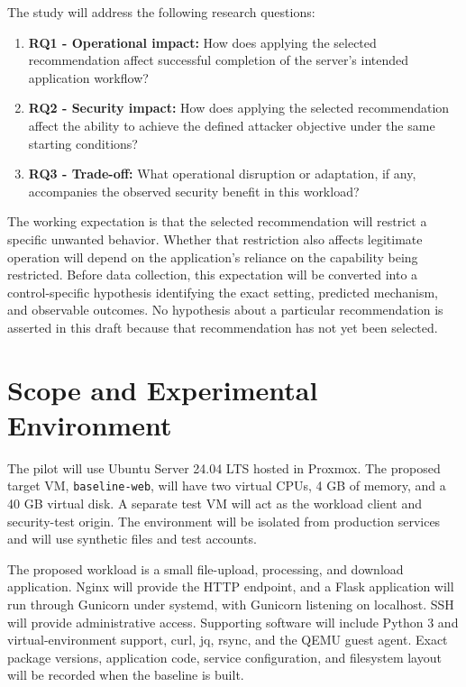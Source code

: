 \documentclass[12pt,letterpaper]{article}
\begin{document}
The study will address the following research questions:

\begin{enumerate}
\item \textbf{RQ1 - Operational impact:} How does applying the selected recommendation affect successful completion of the server's intended application workflow?
\item \textbf{RQ2 - Security impact:} How does applying the selected recommendation affect the ability to achieve the defined attacker objective under the same starting conditions?
\item \textbf{RQ3 - Trade-off:} What operational disruption or adaptation, if any, accompanies the observed security benefit in this workload?
\end{enumerate}

The working expectation is that the selected recommendation will restrict a specific unwanted behavior. Whether that restriction also affects legitimate operation will depend on the application's reliance on the capability being restricted. Before data collection, this expectation will be converted into a control-specific hypothesis identifying the exact setting, predicted mechanism, and observable outcomes. No hypothesis about a particular recommendation is asserted in this draft because that recommendation has not yet been selected.
\section{Scope and Experimental Environment}
\label{sec:orga2568e3}

The pilot will use Ubuntu Server 24.04 LTS hosted in Proxmox. The proposed target VM, \texttt{baseline-web}, will have two virtual CPUs, 4 GB of memory, and a 40 GB virtual disk. A separate test VM will act as the workload client and security-test origin. The environment will be isolated from production services and will use synthetic files and test accounts.

The proposed workload is a small file-upload, processing, and download application. Nginx will provide the HTTP endpoint, and a Flask application will run through Gunicorn under systemd, with Gunicorn listening on localhost. SSH will provide administrative access. Supporting software will include Python 3 and virtual-environment support, curl, jq, rsync, and the QEMU guest agent. Exact package versions, application code, service configuration, and filesystem layout will be recorded when the baseline is built.
\end{document}
